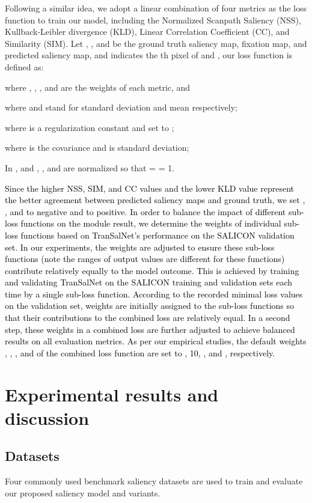\documentclass{article}
\begin{document}
Following a similar idea, we adopt a linear combination of four metrics as the loss function to train our model, including the Normalized Scanpath Saliency (NSS), Kullback-Leibler divergence (KLD), Linear Correlation Coefficient (CC), and Similarity (SIM). 
Let , , and  be the ground truth saliency map, fixation map, and predicted saliency map, and  indicates the th pixel of  and , our loss function is defined as:

where , , , and  are the weights of each metric, and

where  and  stand for standard deviation and mean respectively;

where  is a regularization constant and set to ;

where  is the covariance and  is standard deviation;


In ,  and , , and  are normalized so that  =  = 1.

\textcolor{black}{Since the higher NSS, SIM, and CC values and the lower KLD value represent the better agreement between predicted saliency maps and ground truth, we set , , and  to negative and  to positive. In order to balance the impact of different sub-loss functions on the module result, we determine the weights of individual sub-loss functions based on TranSalNet's performance on the SALICON validation set. In our experiments, the weights are adjusted to ensure these sub-loss functions (note the ranges of output values are different for these functions) contribute relatively equally to the model outcome. This is achieved by training and validating TranSalNet on the SALICON training and validation sets each time by a single sub-loss function. According to the recorded minimal loss values on the validation set, weights are initially assigned to the sub-loss functions so that their contributions to the combined loss are relatively equal. 
In a second step, these weights in a combined loss are further adjusted to achieve balanced results on all evaluation metrics.
As per our empirical studies, the default weights , , , and  of the combined
loss function are set to , 10, , and , respectively.
}


\section{Experimental results and discussion}

\subsection{Datasets}
Four commonly used benchmark saliency datasets are used to train and evaluate our proposed saliency model and variants. 
\end{document}
